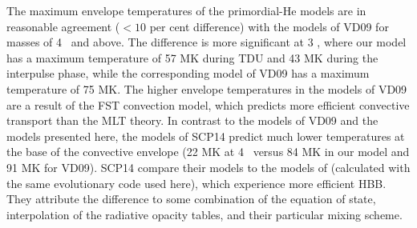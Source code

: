The maximum envelope temperatures of the primordial-He models are in reasonable agreement ($< 10$ per cent difference) with the models of VD09 for masses of 4 \Msun\ and above. The difference is more significant at 3 \Msun, where our model has a maximum temperature of 57 MK during TDU and 43 MK during the interpulse phase, while the corresponding model of VD09 has a maximum temperature of 75 MK. The higher envelope temperatures in the models of VD09 are a result of the FST convection model, which predicts more efficient convective transport than the MLT theory. In contrast to the models of VD09 and the models presented here, the models of SCP14 predict much lower temperatures at the base of the convective envelope (22 MK at 4 \Msun\ versus 84 MK in our model and 91 MK for VD09). SCP14 compare their models to the models of \citet{DOrazi:2013bq} (calculated with the same evolutionary code used here), which experience more efficient HBB. They attribute the difference to some combination of the equation of state, interpolation of the radiative opacity tables, and their particular mixing scheme.


